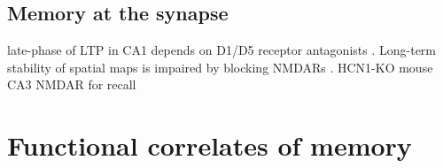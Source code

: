 


\subsection{Memory at the synapse}
\citep{Tsien1996, McHugh1996, Dragoi2013}\citep[reviewed in,][]{Nakazawa2004}
late-phase of LTP in CA1 depends on D1/D5 receptor antagonists \citep{Huang1995}.
Long-term stability of spatial maps is impaired by blocking NMDARs \citep{Kentros1998}.
HCN1-KO mouse \citep{Hussaini2011}
CA3 NMDAR for recall \citep{Nakazawa2002}

\section{Functional correlates of memory}\label{sec:intro:memory:physiology}


